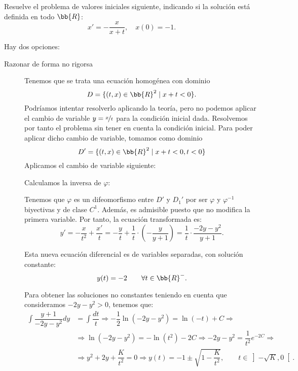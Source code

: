 \documentclass[12pt]{article}
\begin{document}
\begin{ejercicio}
    Resuelve el problema de valores iniciales siguiente, indicando si la solución está definida en todo $\bb{R}$:
    \begin{equation*}
        x'= -\frac{x}{x+t}, \quad x(0)=-1.
    \end{equation*}

    Hay dos opciones:
    \begin{description}
        \item[Razonar de forma no rigorsa]
        
        Tenemos que se trata una ecuación homogénea con dominio $$D=\{(t,x)\in\bb{R}^2\mid x+t<0\}.$$
        Podríamos intentar resolverlo aplicando la teoría, pero no podemos aplicar el cambio de variable $y=\nicefrac{x}{t}$ para la condición inicial dada.
        Resolvemos por tanto el problema sin tener en cuenta la condición inicial. Para poder aplicar dicho cambio de variable, tomamos como dominio
        $$D'=\{(t,x)\in\bb{R}^2\mid x+t< 0,t<0\}$$
        Aplicamos el cambio de variable siguiente:

        Calculamos la inversa de $\varphi$:

        Tenemos que $\varphi$ es un difeomorfismo entre $D'$ y $D_1'$ por ser $\varphi$ y $\varphi^{-1}$ biyectivas y de clase $C^1$.
        Además, es admisible puesto que no modifica la primera variable. Por tanto, la ecuación transformada es:
        \begin{equation*}
            y'=-\dfrac{x}{t^2} + \dfrac{x'}{t}
            = -\dfrac{y}{t} + \dfrac{1}{t}\cdot \left(-\dfrac{y}{y+1}\right)
            = \dfrac{1}{t}\cdot \dfrac{-2y-y^2}{y+1}.
        \end{equation*}

        Esta nueva ecuación diferencial es de variables separadas, con solución constante:
        \begin{equation*}
            y(t)=-2\qquad \forall t\in \bb{R}^-.
        \end{equation*}

        Para obtener las soluciones no constantes teniendo en cuenta que consideramos $-2y-y^2>0$, tenemos que:
        \begin{align*}
            \int \dfrac{y+1}{-2y-y^2}dy &= \int \dfrac{dt}{t}
            \Longrightarrow -\dfrac{1}{2}\ln(-2y-y^2) = \ln(-t) + C
            \Longrightarrow \\&\Longrightarrow \ln(-2y-y^2) = -\ln(t^2)-2C
            \Longrightarrow -2y-y^2 = \dfrac{1}{t^2}e^{-2C}
            \Longrightarrow \\&\Longrightarrow y^2+2y+\dfrac{K}{t^2}=0
            \Longrightarrow y(t)=-1\pm\sqrt{1-\dfrac{K}{t^2}},\qquad t\in \left]-\sqrt{K},0\right[.
        \end{align*}


\end{description}
\end{ejercicio}
\end{document}
